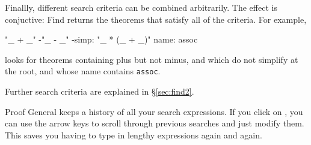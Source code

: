 \begin{isabellebody}
\begin{isamarkuptext}
Finallly, different search criteria can be combined arbitrarily. 
The effect is conjuctive: Find returns the theorems that satisfy all of
the criteria. For example,
\begin{ttbox}
"_ + _"  -"_ - _"  -simp: "_ * (_ + _)"  name: assoc
\end{ttbox}
looks for theorems containing plus but not minus, and which do not simplify
\mbox{\isa{{\isacharunderscore}\ {\isacharasterisk}\ {\isacharparenleft}{\isacharunderscore}\ {\isacharplus}\ {\isacharunderscore}{\isacharparenright}}} at the root, and whose name contains \texttt{assoc}.

Further search criteria are explained in \S\ref{sec:find2}.

\begin{pgnote}
Proof General keeps a history of all your search expressions.
If you click on , you can use the arrow keys to scroll
through previous searches and just modify them. This saves you having
to type in lengthy expressions again and again.
\end{pgnote}%
\end{isamarkuptext}%
\isamarkuptrue%
%
\isadelimtheory
%
\endisadelimtheory
%
\isatagtheory
%
\endisatagtheory
{\isafoldtheory}%
%
\isadelimtheory
%
\endisadelimtheory
\end{isabellebody}%
